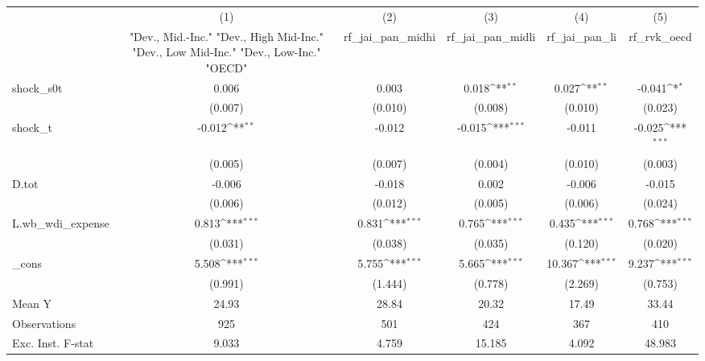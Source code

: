 {
\def\sym#1{\ifmmode^{#1}\else\(^{#1}\)\fi}
\begin{tabular}{l*{5}{c}}
\toprule
            &\multicolumn{1}{c}{(1)}&\multicolumn{1}{c}{(2)}&\multicolumn{1}{c}{(3)}&\multicolumn{1}{c}{(4)}&\multicolumn{1}{c}{(5)}\\
            &\multicolumn{1}{c}{ "Dev., Mid.-Inc." "Dev., High Mid-Inc." "Dev., Low Mid-Inc." "Dev., Low-Inc." "OECD" }&\multicolumn{1}{c}{rf\_jai\_pan\_midhi}&\multicolumn{1}{c}{rf\_jai\_pan\_midli}&\multicolumn{1}{c}{rf\_jai\_pan\_li}&\multicolumn{1}{c}{rf\_rvk\_oecd}\\
\midrule
shock\_s0t   &       0.006         &       0.003         &       0.018\sym{**} &       0.027\sym{**} &      -0.041\sym{*}  \\
            &     (0.007)         &     (0.010)         &     (0.008)         &     (0.010)         &     (0.023)         \\
\addlinespace
shock\_t     &      -0.012\sym{**} &      -0.012         &      -0.015\sym{***}&      -0.011         &      -0.025\sym{***}\\
            &     (0.005)         &     (0.007)         &     (0.004)         &     (0.010)         &     (0.003)         \\
\addlinespace
D.tot       &      -0.006         &      -0.018         &       0.002         &      -0.006         &      -0.015         \\
            &     (0.006)         &     (0.012)         &     (0.005)         &     (0.006)         &     (0.024)         \\
\addlinespace
L.wb\_wdi\_expense&       0.813\sym{***}&       0.831\sym{***}&       0.765\sym{***}&       0.435\sym{***}&       0.768\sym{***}\\
            &     (0.031)         &     (0.038)         &     (0.035)         &     (0.120)         &     (0.020)         \\
\addlinespace
\_cons      &       5.508\sym{***}&       5.755\sym{***}&       5.665\sym{***}&      10.367\sym{***}&       9.237\sym{***}\\
            &     (0.991)         &     (1.444)         &     (0.778)         &     (2.269)         &     (0.753)         \\
\midrule
Mean Y      &       24.93         &       28.84         &       20.32         &       17.49         &       33.44         \\
Observations&         925         &         501         &         424         &         367         &         410         \\
Exc. Inst. F-stat&       9.033         &       4.759         &      15.185         &       4.092         &      48.983         \\
\bottomrule
\end{tabular}
}
